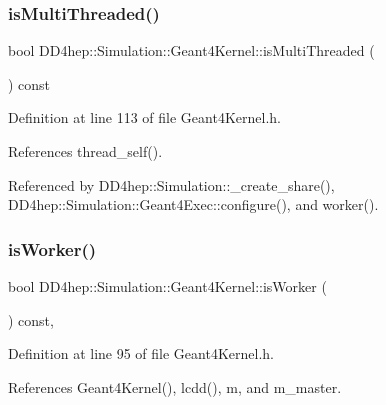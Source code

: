 \subsubsection{\texorpdfstring{is\+Multi\+Threaded()}{isMultiThreaded()}}
{\footnotesize\ttfamily bool D\+D4hep\+::\+Simulation\+::\+Geant4\+Kernel\+::is\+Multi\+Threaded (\begin{DoxyParamCaption}{ }\end{DoxyParamCaption}) const\hspace{0.3cm}{\ttfamily [inline]}}



Definition at line 113 of file Geant4\+Kernel.\+h.



References thread\+\_\+self().



Referenced by D\+D4hep\+::\+Simulation\+::\+\_\+create\+\_\+share(), D\+D4hep\+::\+Simulation\+::\+Geant4\+Exec\+::configure(), and worker().

\hypertarget{class_d_d4hep_1_1_simulation_1_1_geant4_kernel_a08022ebde7100ab9d1b4d7bbd9520d62}{}\label{class_d_d4hep_1_1_simulation_1_1_geant4_kernel_a08022ebde7100ab9d1b4d7bbd9520d62} 
\subsubsection{\texorpdfstring{is\+Worker()}{isWorker()}}
{\footnotesize\ttfamily bool D\+D4hep\+::\+Simulation\+::\+Geant4\+Kernel\+::is\+Worker (\begin{DoxyParamCaption}{ }\end{DoxyParamCaption}) const\hspace{0.3cm}{\ttfamily [inline]}, {\ttfamily [protected]}}



Definition at line 95 of file Geant4\+Kernel.\+h.



References Geant4\+Kernel(), lcdd(), m, and m\+\_\+master.

\hypertarget{class_d_d4hep_1_1_simulation_1_1_geant4_kernel_ad58adb3734f2701198b8915a80cf4cdc}{}\label{class_d_d4hep_1_1_simulation_1_1_geant4_kernel_ad58adb3734f2701198b8915a80cf4cdc} 
